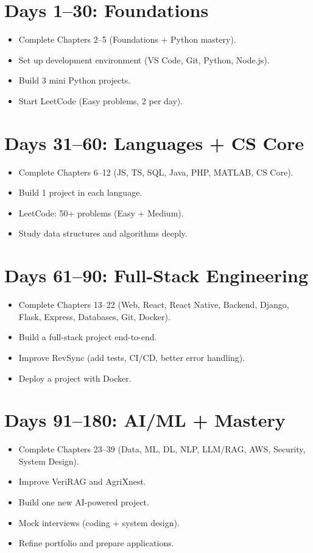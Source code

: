 \documentclass[12pt, a4paper, oneside]{book}
\begin{document}
\section{Days 1--30: Foundations}
\begin{itemize}[leftmargin=2em]
    \item Complete Chapters 2--5 (Foundations + Python mastery).
    \item Set up development environment (VS Code, Git, Python, Node.js).
    \item Build 3 mini Python projects.
    \item Start LeetCode (Easy problems, 2 per day).
\end{itemize}

\section{Days 31--60: Languages + CS Core}
\begin{itemize}[leftmargin=2em]
    \item Complete Chapters 6--12 (JS, TS, SQL, Java, PHP, MATLAB, CS Core).
    \item Build 1 project in each language.
    \item LeetCode: 50+ problems (Easy + Medium).
    \item Study data structures and algorithms deeply.
\end{itemize}

\section{Days 61--90: Full-Stack Engineering}
\begin{itemize}[leftmargin=2em]
    \item Complete Chapters 13--22 (Web, React, React Native, Backend, Django, Flask, Express, Databases, Git, Docker).
    \item Build a full-stack project end-to-end.
    \item Improve RevSync (add tests, CI/CD, better error handling).
    \item Deploy a project with Docker.
\end{itemize}

\section{Days 91--180: AI/ML + Mastery}
\begin{itemize}[leftmargin=2em]
    \item Complete Chapters 23--39 (Data, ML, DL, NLP, LLM/RAG, AWS, Security, System Design).
    \item Improve VeriRAG and AgriXnest.
    \item Build one new AI-powered project.
    \item Mock interviews (coding + system design).
    \item Refine portfolio and prepare applications.
\end{itemize}
\end{document}
